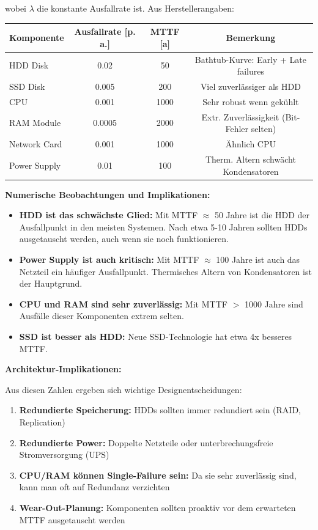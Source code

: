 \documentclass[a4paper,11pt]{article}
\theoremstyle{definition}
\begin{document}
wobei $\lambda$ die konstante Ausfallrate ist. Aus Herstellerangaben:

\begin{table}[H]
    \centering
    \begin{tabular}{|l|cc|c|}
        \hline
        Komponente & Ausfallrate [p. a.] & MTTF [a] & Bemerkung \\
        \hline
        HDD Disk & 0.02 & 50 & Bathtub-Kurve: Early + Late failures \\
        SSD Disk & 0.005 & 200 & Viel zuverlässiger als HDD \\
        CPU & 0.001 & 1000 & Sehr robust wenn gekühlt \\
        RAM Module & 0.0005 & 2000 & Extr. Zuverlässigkeit (Bit-Fehler selten) \\
        Network Card & 0.001 & 1000 & Ähnlich CPU \\
        Power Supply & 0.01 & 100 & Therm. Altern schwächt Kondensatoren \\
        \hline
    \end{tabular}
\end{table}

\textbf{Numerische Beobachtungen und Implikationen:}

\begin{itemize}
    \item \textbf{HDD ist das schwächste Glied:} Mit MTTF $\approx$ 50 Jahre ist die HDD 
          der Ausfallpunkt in den meisten Systemen. Nach etwa 5-10 Jahren sollten HDDs 
          ausgetauscht werden, auch wenn sie noch funktionieren.
    
    \item \textbf{Power Supply ist auch kritisch:} Mit MTTF $\approx$ 100 Jahre ist 
          auch das Netzteil ein häufiger Ausfallpunkt. Thermisches Altern von Kondensatoren 
          ist der Hauptgrund.
    
    \item \textbf{CPU und RAM sind sehr zuverlässig:} Mit MTTF $>$ 1000 Jahre sind 
          Ausfälle dieser Komponenten extrem selten.
    
    \item \textbf{SSD ist besser als HDD:} Neue SSD-Technologie hat etwa 4x besseres MTTF.
\end{itemize}

\textbf{Architektur-Implikationen:}

Aus diesen Zahlen ergeben sich wichtige Designentscheidungen:
\begin{enumerate}
    \item \textbf{Redundierte Speicherung:} HDDs sollten immer redundiert sein (RAID, Replication)
    \item \textbf{Redundierte Power:} Doppelte Netzteile oder unterbrechungsfreie Stromversorgung (UPS)
    \item \textbf{CPU/RAM können Single-Failure sein:} Da sie sehr zuverlässig sind, kann man 
          oft auf Redundanz verzichten
    \item \textbf{Wear-Out-Planung:} Komponenten sollten proaktiv vor dem erwarteten MTTF 
          ausgetauscht werden
\end{enumerate}
\end{document}
